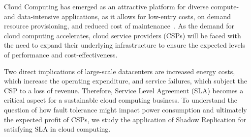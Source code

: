 Cloud Computing has emerged as an attractive platform for 
diverse compute- and data-intensive applications, as it allows for
low-entry costs, on demand resource provisioning, and
reduced cost of maintenance~\cite{tchana_cits_2012}. %
As the demand for cloud computing
accelerates, cloud service providers (CSPs) will be faced with the
need to expand their underlying infrastructure to ensure the expected
levels of performance and cost-effectiveness. %

Two direct implications of large-scale datacenters are increased energy costs, which increase the operating expenditure, and service failures, which subject the CSP to a loss of revenue. Therefore, Service Level Agreement (SLA) becomes a critical aspect for a sustainable cloud computing business. To understand the question of how
fault tolerance might impact power consumption and ultimately the
expected profit of CSPs, we  
study the application of Shadow Replication for satisfying SLA in cloud computing.

%
%
%

